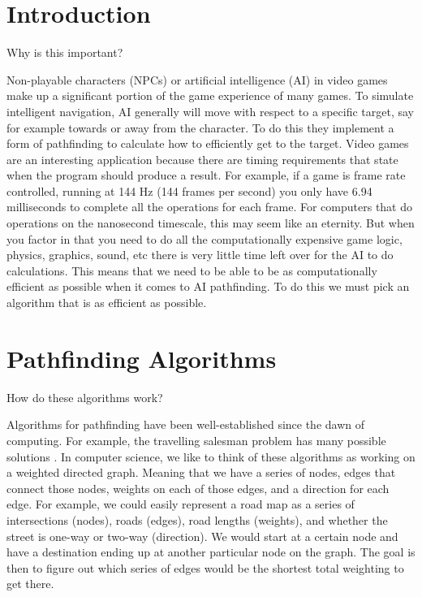 \documentclass[letterpaper,12pt]{article}  %
\begin{document}
\section{Introduction}
Why is this important?

Non-playable characters (NPCs) or artificial intelligence (AI) in video games 
make up a significant portion of the game experience of many games. To simulate 
intelligent navigation, AI generally will move with respect to a specific 
target, say for example towards or away from the character. To do this they 
implement a form of pathfinding to calculate how to efficiently get to the 
target. Video games are an interesting application because there are timing 
requirements that state when the program should produce a result. For example, 
if a game is frame rate controlled, running at 144 Hz (144 frames per second) 
you only have 6.94 milliseconds to complete all the operations for each frame. 
For computers that do operations on the nanosecond timescale, this may seem 
like an eternity. But when you factor in that you need to do all the 
computationally expensive game logic, physics, graphics, sound, etc there is 
very little time left over for the AI to do calculations. This means that we 
need to be able to be as computationally efficient as possible when it comes to 
AI pathfinding. To do this we must pick an algorithm that is as efficient as 
possible. 

\section{Pathfinding Algorithms}
\label{section:Pathfinding_Algorithms}
How do these algorithms work?

Algorithms for pathfinding have been well-established since the dawn of 
computing. For example, the travelling salesman problem has many possible 
solutions \cite{ TravellingSalesmanProblem2022}. In computer science, we like 
to think of these algorithms as working on a weighted directed graph. Meaning 
that we have a series of nodes, edges that connect those nodes, weights on each 
of those edges, and a direction for each edge. For example, we could easily 
represent a road map as a series of intersections (nodes), roads (edges), road 
lengths (weights), and whether the street is one-way or two-way (direction). We 
would start at a certain node and have a destination ending up at another 
particular node on the graph. The goal is then to figure out which series of 
edges would be the shortest total weighting to get there.
\end{document}
